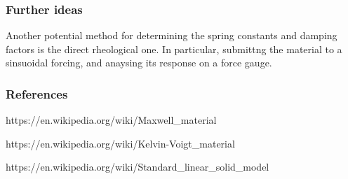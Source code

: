 \documentclass[11pt]{article}
\begin{document}
\subsubsection{Further ideas}\label{further-ideas}

Another potential method for determining the spring constants and
damping factors is the direct rheological one. In particular, submittng
the material to a sinsuoidal forcing, and anaysing its response on a
force gauge.

    \subsubsection{References}\label{references}

https://en.wikipedia.org/wiki/Maxwell\_material

https://en.wikipedia.org/wiki/Kelvin-Voigt\_material

https://en.wikipedia.org/wiki/Standard\_linear\_solid\_model


    
    
    
    
\end{document}
